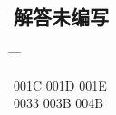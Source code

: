 \documentclass[twoside, twocolumn]{ctexart}
\newenvironment{problist}{
  \begin{center} \ttfamily \begin{tabbing}
      \hspace{50pt} \= \hspace{50pt} \= \hspace{50pt} \= \kill
  }{ \end{tabbing} \end{center} }
\begin{document}
  \subsection*{解答未编写}

  \begin{problist}
    001C \> 001D \> 001E  \\ 0033 \> 003B \> 004B \\
  \end{problist}
\end{document}
